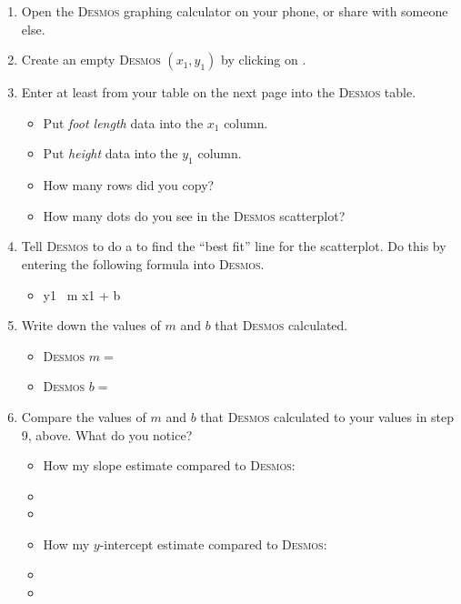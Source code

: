 \documentclass[12pt,letterpaper]{memoir}
\begin{document}
\begin{enumerate}[fullwidth,label={\Large$\bm{\square}$}\,\arabic*.,resume]
    \item Open the {\scshape Desmos} graphing calculator on your phone, or share with someone else.
    \item Create an empty {\scshape Desmos} $(x_1,y_1)$  by clicking on \fbox{\Large +}.
    \item Enter at least  from your table on the next page into the {\scshape Desmos} table.
        \begin{itemize}[nosep]
            \item Put {\itshape foot length} data into the $x_1$ column.
            \item Put {\itshape height} data into the $y_1$ column.
            \item How many rows did you copy? \underline{\hspace{1in}}
            \item How many dots do you see in the {\scshape Desmos} scatterplot? \underline{\hspace{1in}}
        \end{itemize}
    \item Tell {\scshape Desmos} to do a  
        to find the ``best fit'' line for the scatterplot.
        Do this by entering the following formula into {\scshape Desmos}.
        \begin{itemize}[nosep]
            \item {\ttfamily y1 \raisebox{0.25em}{\large\texttildelow}\, m x1  +  b}
        \end{itemize}
    \item Write down the values of $m$ and $b$ that {\scshape Desmos} calculated.
        \begin{itemize}[nosep]
            \item {\scshape Desmos} $m =$ \underline{\hspace{0.5in}}
            \item {\scshape Desmos} $b =$ \underline{\hspace{0.5in}}
        \end{itemize}
\item Compare the values of $m$ and $b$ that {\scshape Desmos} calculated 
        to your values in step 9, above. What do you notice?
        \begin{itemize}
            \item How my slope estimate compared to {\scshape Desmos}: \hrulefill
            \item[] \hrulefill
            \item[] \hrulefill
            \item How my $y$-intercept estimate compared to {\scshape Desmos}: \hrulefill
            \item[] \hrulefill
            \item[] \hrulefill
        \end{itemize}
\end{enumerate}
\end{document}
